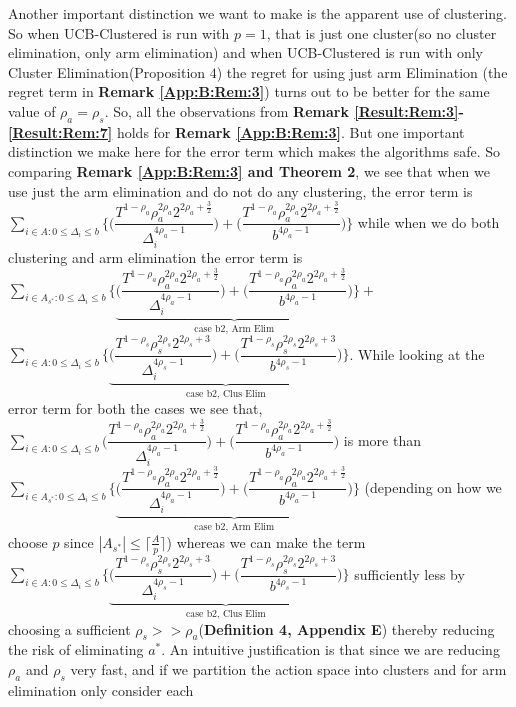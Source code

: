 \begin{remark}
\label{App:C:Rem:2}
Another important distinction we want to make is the apparent use of clustering. So when UCB-Clustered is run with $p=1$, that is just one cluster(so no cluster elimination, only arm elimination) and when UCB-Clustered is run with only Cluster Elimination(Proposition $4$) the regret for using just arm Elimination (the regret term in \textbf{Remark \ref{App:B:Rem:3}}) turns out to be better for the same value of $\rho_{a}=\rho_{s}$. So, all the observations from \textbf{Remark \ref{Result:Rem:3}-\ref{Result:Rem:7}} holds for \textbf{Remark \ref{App:B:Rem:3}}. But one important distinction we make here for the error term which makes the algorithms safe. So comparing \textbf{Remark \ref{App:B:Rem:3} and Theorem 2}, we see that when we use just the arm elimination and do not do any clustering, the error term is $\sum_{i\in A:0\leq\Delta_{i}\leq b}\bigg\lbrace\bigg(\dfrac{T^{1-\rho_{a}}\rho_{a}^{2\rho_{a}}2^{2\rho_{a}+\frac{3}{2}}}{\Delta_{i}^{4\rho_{a} -1}} \bigg) + \bigg( \dfrac{T^{1-\rho_{a}}\rho_{a}^{2\rho_{a}}2^{2\rho_{a}+\frac{3}{2}}}{b^{4\rho_{a} -1}} \bigg)\bigg\rbrace$ while when we do both clustering and arm elimination the error term is $\sum_{i\in A_{s^{*}}:0\leq\Delta_{i}\leq b}\bigg\lbrace \underbrace{\bigg(\dfrac{T^{1-\rho_{a}}\rho_{a}^{2\rho_{a}}2^{2\rho_{a}+\frac{3}{2}}}{\Delta_{i}^{4\rho_{a}-1}} \bigg)+\bigg(\dfrac{T^{1-\rho_{a}}\rho_{a}^{2\rho_{a}}2^{2\rho_{a}+\frac{3}{2}}}{b^{4\rho_{a} -1}} \bigg)}_{\text{case b2, Arm Elim}}\bigg\rbrace +$\newline $ \sum_{i\in A:0\leq\Delta_{i}\leq b}\bigg\lbrace\underbrace{\bigg(\dfrac{T^{1-\rho_{s}}\rho_{s}^{2\rho_{s}}2^{2\rho_{s}+3}}{\Delta_{i}^{4\rho_{s}-1}} \bigg)+\bigg(\dfrac{T^{1-\rho_{s}}\rho_{s}^{2\rho_{s}}2^{2\rho_{s}+3}}{b^{4\rho_{s} -1}} \bigg)}_{\text{case b2, Clus Elim}} \bigg\rbrace$. While looking at the error term for both the cases we see that, $\sum_{i\in A:0\leq\Delta_{i}\leq b}\bigg(\dfrac{T^{1-\rho_{a}}\rho_{a}^{2\rho_{a}}2^{2\rho_{a}+\frac{3}{2}}}{\Delta_{i}^{4\rho_{a} -1}} \bigg) + \bigg( \dfrac{T^{1-\rho_{a}}\rho_{a}^{2\rho_{a}}2^{2\rho_{a}+\frac{3}{2}}}{b^{4\rho_{a} -1}} \bigg)$ is more than \newline $ \sum_{i\in A_{s^{*}}:0\leq\Delta_{i}\leq b}\bigg\lbrace \underbrace{\bigg(\dfrac{T^{1-\rho_{a}}\rho_{a}^{2\rho_{a}}2^{2\rho_{a}+\frac{3}{2}}}{\Delta_{i}^{4\rho_{a}-1}} \bigg)+\bigg(\dfrac{T^{1-\rho_{a}}\rho_{a}^{2\rho_{a}}2^{2\rho_{a}+\frac{3}{2}}}{b^{4\rho_{a} -1}} \bigg)}_{\text{case b2, Arm Elim}}\bigg\rbrace$ (depending on how we choose $p$ since $|A_{s^{*}}|\leq \lceil\frac{A}{p}\rceil$) whereas we can make the term  $\sum_{i\in A:0\leq\Delta_{i}\leq b}\bigg\lbrace\underbrace{\bigg(\dfrac{T^{1-\rho_{s}}\rho_{s}^{2\rho_{s}}2^{2\rho_{s}+3}}{\Delta_{i}^{4\rho_{s}-1}} \bigg)+\bigg(\dfrac{T^{1-\rho_{s}}\rho_{s}^{2\rho_{s}}2^{2\rho_{s}+3}}{b^{4\rho_{s} -1}} \bigg)}_{\text{case b2, Clus Elim}} \bigg\rbrace$ sufficiently less by choosing a sufficient $\rho_{s}>> \rho_{a}$(\textbf{Definition 4, Appendix E}) thereby reducing the risk of eliminating $a^{*}$. An intuitive justification is that since we are reducing $\rho_{a}$ and $\rho_{s}$ very fast, and if we partition the action space into clusters and for arm elimination only consider each 
\end{remark}
